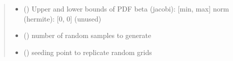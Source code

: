 \documentclass[letterpaper,10pt,english,openany,oneside]{sphinxmanual}
\begin{document}
\begin{fulllineitems}
\begin{quote}
\begin{description}
\begin{itemize}
\item {} 
 (\sphinxstyleliteralemphasis{\sphinxupquote{{[}}}\sphinxstyleliteralemphasis{\sphinxupquote{{]} }}) \textendash{} Upper and lower bounds of PDF
beta (jacobi):  {[}min, max{]}
norm (hermite): {[}0, 0{]} (unused)

\item {} 
 () \textendash{} number of random samples to generate

\item {} 
 (\sphinxstyleliteralemphasis{\sphinxupquote{, }}\sphinxstyleliteralemphasis{\sphinxupquote{, }}) \textendash{} seeding point to replicate random grids

\end{itemize}

\end{description}\end{quote}

\end{fulllineitems}

\end{document}
